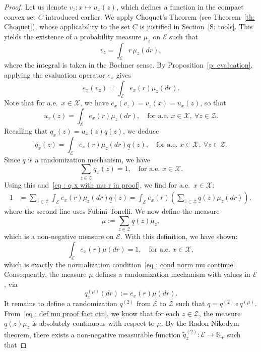 \documentclass[a4paper, 11pt]{article}
\theoremstyle{definition}
\newcommand{\theconvex}{C}
\begin{document}
{\begin{proof}
Let us denote $v_z : x \mapsto u_x(z)$, which defines a function in the compact convex set $\theconvex$ introduced earlier. We apply Choquet's Theorem (see Theorem~\ref{th: Choquet}), whose applicability to the set $\theconvex$ is justified in Section~\ref{S: tools}. This yields the existence of a probability measure $\mu_z$ on $\mathcal{E}$ such that
\[
v_z = \int_{\mathcal{E}} r \, \mu_z(dr),
\]
where the integral is taken in the Bochner sense. %
By Proposition~\ref{p: evaluation}, applying the evaluation operator $e_x$ gives
\[
e_x(v_z) = \int_{\mathcal{E}} e_x(r) \mu_z(dr).
\]
Note that for a.e.\ $x \in \mathcal{X}$, we have $e_x(v_z) = v_z(x) = u_x(z)$, so that
\[
u_x(z) = \int_{\mathcal{E}} e_x(r) \mu_z(dr), \quad \text{for a.e.\ } x \in \mathcal{X},\ \forall z \in \mathcal{Z}.
\]
Recalling that $q_x(z) = u_x(z) \underline{q}(z)$, we deduce
\begin{equation}
\label{eq : q x with mu r in proof}
q_x(z) = \int_{\mathcal{E}} e_x(r) \mu_z(dr)\underline{q}(z), \quad \text{for a.e.\ } x \in \mathcal{X},\ \forall z \in \mathcal{Z}.
\end{equation}
Since $q$ is a randomization mechanism, we have
\[
\sum_{z \in \mathcal{Z}} q_x(z) = 1, \quad \text{for a.e.\ } x \in \mathcal{X}.
\]
Using this and~\eqref{eq : q x with mu r in proof}, we find for a.e.\ $x \in \mathcal{X}$:
\begin{align*}
1 &= \sum_{z \in \mathcal{Z}} \int_{\mathcal{E}} e_x(r) \mu_z(dr) \underline{q}(z) = \int_{\mathcal{E}} e_x(r) \left( \sum_{z \in \mathcal{Z}} \underline{q}(z) \mu_z(dr) \right),
\end{align*}
where the second line uses Fubini-Tonelli. We now define the measure
\begin{equation}
\label{eq : def mu proof fact ctn}
\mu := \sum_{z \in \mathcal{Z}} \underline{q}(z) \mu_z,
\end{equation}
which is a non-negative measure on $\mathcal{E}$. With this definition, we have shown:
\[
\int_{\mathcal{E}} e_x(r) \mu(dr) = 1, \quad \text{for a.e.\ } x \in \mathcal{X},
\]
which is exactly the normalization condition~\eqref{eq : cond norm mu continue}. Consequently, the measure $\mu$ defines a randomization mechanism with values in $\mathcal{E}$, via
\[
q^{(\mu)}_x(dr) := e_x(r) \mu(dr).
\]
It remains to define a randomization $q^{(2)}$ from $\mathcal{E}$ to $\mathcal{Z}$ such that $q = q^{(2)} \circ q^{(\mu)}$. From~\eqref{eq : def mu proof fact ctn}, we know that for each $z \in \mathcal{Z}$, the measure $\underline{q}(z) \mu_z$ is absolutely continuous with respect to $\mu$. By the Radon-Nikodym theorem, there exists a non-negative measurable function $\tilde{q}^{(2)}_z : \mathcal{E} \to \mathbb{R}_+$ such that

\end{proof}}
\end{document}
